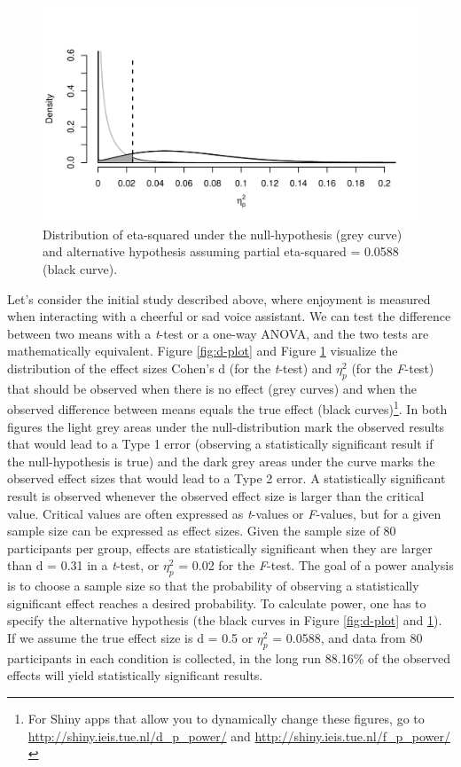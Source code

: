 \documentclass[,jou, draftfirst, a4paper,floatsintext]{apa6}
\let\rmarkdownfootnote\footnote%
\def\footnote{\protect\rmarkdownfootnote}
\begin{document}
\begin{figure}
\centering
\includegraphics{0.1_Simulation_Based_Power_Analysis_For_Factorial_ANOVA_Designs_files/figure-latex/eta-plot-1.pdf}
\caption{\label{fig:eta-plot}Distribution of eta-squared under the null-hypothesis (grey curve) and alternative hypothesis assuming partial eta-squared = 0.0588 (black curve).}
\end{figure}

Let's consider the initial study described above, where enjoyment is measured when interacting with a cheerful or sad voice assistant.
We can test the difference between two means with a \emph{t}-test or a one-way ANOVA, and the two tests are mathematically equivalent.
Figure \ref{fig:d-plot} and Figure \ref{fig:eta-plot} visualize the distribution of the effect sizes Cohen's d (for the \emph{t}-test) and \(\eta_p^2\) (for the \emph{F}-test) that should be observed when there is no effect (grey curves) and when the observed difference between means equals the true effect (black curves)\footnote{For Shiny apps that allow you to dynamically change these figures, go to \url{http://shiny.ieis.tue.nl/d_p_power/} and \url{http://shiny.ieis.tue.nl/f_p_power/}}.
In both figures the light grey areas under the null-distribution mark the observed results that would lead to a Type 1 error (observing a statistically significant result if the null-hypothesis is true) and the dark grey areas under the curve marks the observed effect sizes that would lead to a Type 2 error.
A statistically significant result is observed whenever the observed effect size is larger than the critical value.
Critical values are often expressed as \emph{t}-values or \emph{F}-values, but for a given sample size can be expressed as effect sizes.
Given the sample size of 80 participants per group, effects are statistically significant when they are larger than d = 0.31 in a \emph{t}-test, or \(\eta_p^2\) = 0.02 for the \emph{F}-test.
The goal of a power analysis is to choose a sample size so that the probability of observing a statistically significant effect reaches a desired probability.
To calculate power, one has to specify the alternative hypothesis (the black curves in Figure \ref{fig:d-plot} and \ref{fig:eta-plot}).
If we assume the true effect size is d = 0.5 or \(\eta_p^2\) = 0.0588, and data from 80 participants in each condition is collected, in the long run 88.16\% of the observed effects will yield statistically significant results.
\end{document}
